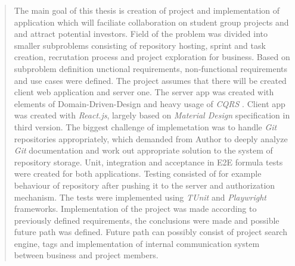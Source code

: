 {
\begin{abstract}
The main goal of this thesis is creation of project and implementation of application which will faciliate
collaboration on student group projects and and attract potential investors. Field of the problem was divided into smaller
subproblems consisting of repository hosting, sprint and task creation, recrutation process and project exploration for business. Based on subproblem definition
unctional requirements, non-functional requirements and use cases were defined. The project assumes that there will be created client web application and server one.
The server app was created with elements of Domain-Driven-Design and heavy usage of \textit{CQRS} \cite{CQRS}. Client app was created with
\textit{React.js}, largely based on \textit{Material Design} specification in third version. The biggest challenge of implemetation was to handle \textit{Git} repositories appropriately,
which demanded from Author to deeply analyze \textit{Git} documentation and work out appropriate solution to the system of repository storage. Unit, integration and acceptance in E2E formula tests were created for both applications.
Testing consisted of for example behaviour of repository after pushing it to the server and authorization mechanism. The tests were implemented 
using \textit{TUnit} and \textit{Playwright} frameworks. Implementation of the project was made according to previously defined requirements, the conclusions were made and possible future path was defined.
Future path can possibly consist of project search engine, tags and implementation of internal communication system between business and project members.
\end{abstract}
\mykeywords
}
